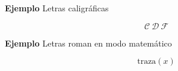 \documentclass[11pt,a4paper]{report}
\begin{document}
\bigskip
\textbf{Ejemplo} Letras caligráficas

\begin{equation*}
\mathcal{C \ D \ F}
\end{equation*}

\bigskip





\bigskip
\textbf{Ejemplo} Letras roman en modo matemático

\begin{equation*}
\mathrm{traza}(x)
\end{equation*}

\bigskip





\end{document}
